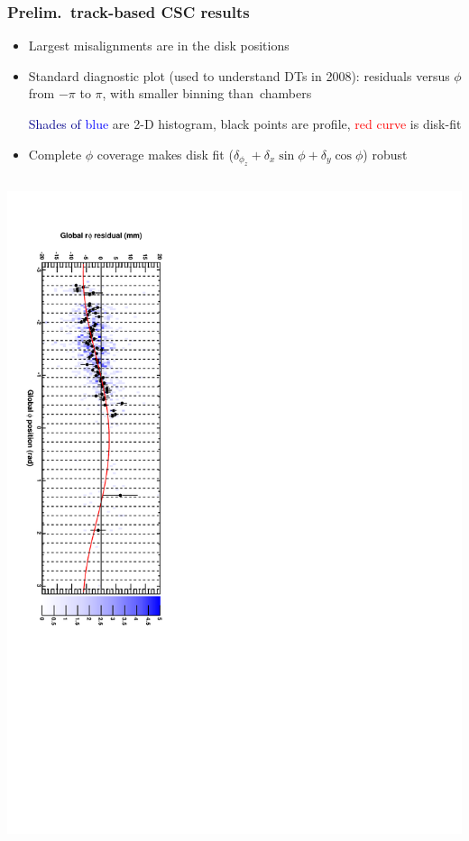 \documentclass[compress]{beamer}
\begin{document}
\begin{frame}
\frametitle{Prelim.\ track-based CSC results}

\begin{itemize}
\item Largest misalignments are in the disk positions
\item Standard diagnostic plot (used to understand DTs in 2008):
  residuals versus $\phi$ from $-\pi$ to $\pi$, with smaller binning
  \mbox{than chambers\hspace{-1 cm}}

  {\scriptsize \textcolor{darkblue}{Shades of} \textcolor{blue}{blue} are 2-D histogram, black points are profile, \textcolor{red}{red curve} is disk-fit}

\item Complete $\phi$ coverage makes disk fit \mbox{\scriptsize ($\delta_{\phi_z}+\delta_x\sin\phi+\delta_y\cos\phi$)} robust
\end{itemize}

\begin{columns}
\includegraphics[height=\linewidth, angle=90]{demonstrate_2008.pdf}


\end{columns}
\end{frame}
\end{document}
